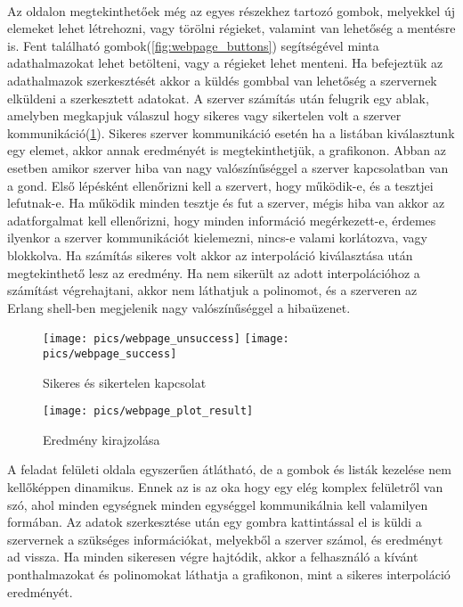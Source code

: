 	\paragraph{}
	Az oldalon megtekinthetőek még az egyes részekhez tartozó gombok, melyekkel új elemeket lehet létrehozni, vagy törölni régieket, valamint van lehetőség a mentésre is.
	Fent található gombok(\ref{fig:webpage_buttons}) segítségével minta adathalmazokat lehet betölteni, vagy a régieket lehet menteni. Ha befejeztük az adathalmazok szerkesztését akkor a küldés gombbal van lehetőség a szervernek elküldeni a szerkesztett adatokat.
	\newline 
	A szerver számítás után felugrik egy ablak, amelyben megkapjuk válaszul hogy sikeres vagy sikertelen volt a szerver kommunikáció(\ref{fig:webpage_unsuccess}).\newline
	Sikeres szerver kommunikáció esetén ha a listában kiválasztunk egy elemet, akkor annak eredményét is megtekinthetjük, a grafikonon.
	\newline Abban az esetben amikor szerver hiba van nagy valószínűséggel a szerver kapcsolatban van a gond. Első lépésként ellenőrizni kell a szervert, hogy működik-e, és a tesztjei lefutnak-e. Ha működik minden tesztje és fut a szerver, mégis hiba van akkor az adatforgalmat kell ellenőrizni, hogy minden információ megérkezett-e, érdemes ilyenkor a szerver kommunikációt kielemezni, nincs-e valami korlátozva, vagy blokkolva.
	\newline
	Ha számítás sikeres volt akkor az interpoláció kiválasztása után megtekinthető lesz az eredmény. Ha nem sikerült az adott interpolációhoz a számítást végrehajtani, akkor nem láthatjuk a polinomot, és a szerveren az Erlang shell-ben megjelenik nagy valószínűséggel a hibaüzenet.

	\begin{figure}[h]
		\texttt{[image: pics/webpage\_unsuccess]}
		\texttt{[image: pics/webpage\_success]}
		\centering
		\caption{Sikeres és sikertelen kapcsolat\label{fig:webpage_unsuccess}}
	\end{figure}

	\begin{figure}[h]
		\texttt{[image: pics/webpage\_plot\_result]}
		\centering
		\caption{Eredmény kirajzolása\label{fig:webpage_plot_result}}
	\end{figure}
	A feladat felületi oldala egyszerűen átlátható, de a gombok és listák kezelése nem kellőképpen dinamikus. Ennek az is az oka hogy egy elég komplex felületről van szó, ahol minden egységnek minden egységgel kommunikálnia kell valamilyen formában. \newline
	Az adatok szerkesztése után egy gombra kattintással el is küldi a szervernek a szükséges információkat, melyekből a szerver számol, és eredményt ad vissza. \newline
	Ha minden sikeresen végre hajtódik, akkor a felhasználó a kívánt ponthalmazokat és polinomokat láthatja a grafikonon, mint a sikeres interpoláció eredményét.

